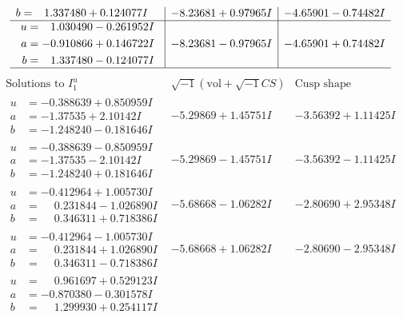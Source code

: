 \documentclass[1p]{elsarticle_modified}
\theoremstyle{definition}
\newcommand{\I}{\sqrt{-1}}
\begin{document}
$$\begin{array}{c|c|c}
\begin{aligned}
b &= \phantom{-}1.337480 + 0.124077 I\end{aligned}
 & -8.23681 + 0.97965 I & -4.65901 - 0.74482 I \\ \hline\begin{aligned}
u &= \phantom{-}1.030490 - 0.261952 I \\
a &= -0.910866 + 0.146722 I \\
b &= \phantom{-}1.337480 - 0.124077 I\end{aligned}
 & -8.23681 - 0.97965 I & -4.65901 + 0.74482 I\\
 \hline 
 \end{array}$$\newpage$$\begin{array}{c|c|c}  
\text{Solutions to }I^u_{1}& \I (\text{vol} + \sqrt{-1}CS) & \text{Cusp shape}\\
 \hline 
\begin{aligned}
u &= -0.388639 + 0.850959 I \\
a &= -1.37535 + 2.10142 I \\
b &= -1.248240 - 0.181646 I\end{aligned}
 & -5.29869 + 1.45751 I & -3.56392 + 1.11425 I \\ \hline\begin{aligned}
u &= -0.388639 - 0.850959 I \\
a &= -1.37535 - 2.10142 I \\
b &= -1.248240 + 0.181646 I\end{aligned}
 & -5.29869 - 1.45751 I & -3.56392 - 1.11425 I \\ \hline\begin{aligned}
u &= -0.412964 + 1.005730 I \\
a &= \phantom{-}0.231844 - 1.026890 I \\
b &= \phantom{-}0.346311 + 0.718386 I\end{aligned}
 & -5.68668 - 1.06282 I & -2.80690 + 2.95348 I \\ \hline\begin{aligned}
u &= -0.412964 - 1.005730 I \\
a &= \phantom{-}0.231844 + 1.026890 I \\
b &= \phantom{-}0.346311 - 0.718386 I\end{aligned}
 & -5.68668 + 1.06282 I & -2.80690 - 2.95348 I \\ \hline\begin{aligned}
u &= \phantom{-}0.961697 + 0.529123 I \\
a &= -0.870380 - 0.301578 I \\
b &= \phantom{-}1.299930 + 0.254117 I\end{aligned}

\end{array}$$
\end{document}
